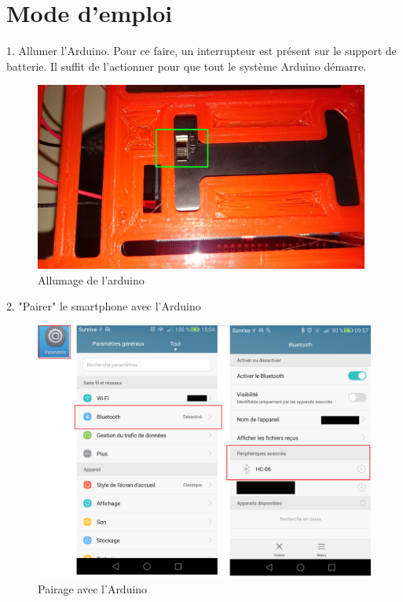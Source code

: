 \section{Mode d'emploi}
1. Allumer l'Arduino. Pour ce faire, un interrupteur est présent sur le support de batterie. Il suffit de l'actionner pour que tout le système Arduino démarre.\\
\begin{figure}[H]
	\begin{center}
		\includegraphics[width=11cm]{img/arduino_startup.jpg}
		\caption{Allumage de l'arduino}
		\label{arduino_start}
	\end{center}
\end{figure}
2. "Pairer" le smartphone avec l'Arduino
\begin{figure}[H]
	\begin{center}
		\includegraphics[width=15cm]{img/pairDevice.png}
		\caption{Pairage avec l'Arduino}
		\label{paired}
	\end{center}
\end{figure}
